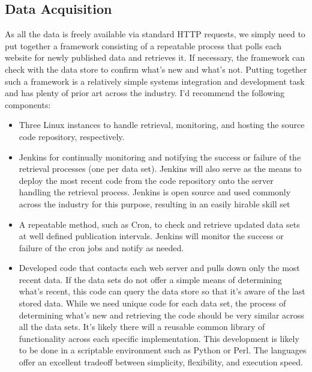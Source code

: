 \subsection*{Data Acquisition}
As all the data is freely available via standard HTTP requests, we simply need to put together a framework consisting of a repeatable process that polls each website for newly published data and retrieves it. If necessary, the framework can check with the data store to confirm what's new and what's not. Putting together such a framework is a relatively simple systems integration and development task and has plenty of prior art across the industry. I'd recommend the following components:
\begin{itemize}
	\item Three Linux instances to handle retrieval, monitoring, and hosting the source code repository, respectively.
	\item Jenkins for continually monitoring and notifying the success or failure of the retrieval processes (one per data set). Jenkins will also serve as the means to deploy the most recent code from the code repository onto the server handling the retrieval process. Jenkins is open source and used commonly across the industry for this purpose, resulting in an easily hirable skill set \cite{jenkins}
	\item A repeatable method, such as Cron, to check and retrieve updated data sets at well defined publication intervals. Jenkins will monitor the success or failure of the cron jobs and notify as needed.
	\item Developed code that contacts each web server and pulls down only the most recent data. If the data sets do not offer a simple means of determining what's recent, this code can query the data store so that it's aware of the last stored data. While we need unique code for each data set, the process of determining what's new and retrieving the code should be very similar across all the data sets. It's likely there will a reusable common library of functionality across each specific implementation. This development is likely to be done in a scriptable environment such as Python or Perl. The languages offer an excellent tradeoff between simplicity, flexibility, and execution speed.
\end{itemize}

